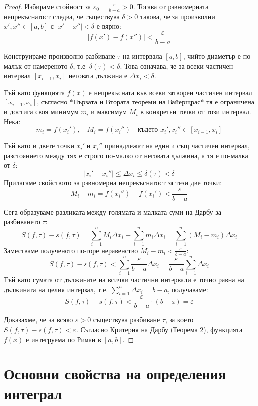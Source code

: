\documentclass{scrartcl}
\begin{document}
\begin{FlushLeft}
\begin{proof}
Избираме стойност за $\varepsilon_0 = \frac{\varepsilon}{b - a} > 0$. Тогава от равномерната непрекъснатост следва, че съществува $\delta > 0$ такова, че за произволни $x', x'' \in [a, b]$ с $|x' - x''| < \delta$ е вярно:
\[ |f(x') - f(x'')| < \frac{\varepsilon}{b - a} \]

Конструираме произволно разбиване $\tau$ на интервала $[a, b]$, чийто диаметър е по-малък от намереното $\delta$, т.е. $\delta(\tau) < \delta$. Това означава, че за всеки частичен интервал $[x_{i-1}, x_i]$ неговата дължина е $\Delta x_i < \delta$.

Тъй като функцията $f(x)$ е непрекъсната във всеки затворен частичен интервал $[x_{i-1}, x_i]$, съгласно *Първата и Втората теореми на Вайерщрас* тя е ограничена и достига своя минимум $m_i$ и максимум $M_i$ в конкретни точки от този интервал. Нека:
\[ m_i = f(x_i'), \quad M_i = f(x_i'') \quad \text{където } x_i', x_i'' \in [x_{i-1}, x_i] \]

Тъй като и двете точки $x_i'$ и $x_i''$ принадлежат на един и същ частичен интервал, разстоянието между тях е строго по-малко от неговата дължина, а тя е по-малка от $\delta$:
\[ |x_i' - x_i''| \le \Delta x_i \le \delta(\tau) < \delta \]
Прилагаме свойството за равномерна непрекъснатост за тези две точки:
\[ M_i - m_i = f(x_i'') - f(x_i') < \frac{\varepsilon}{b - a} \]

Сега образуваме разликата между голямата и малката суми на Дарбу за разбиването $\tau$:
\[ S(f, \tau) - s(f, \tau) = \sum_{i=1}^{n} M_i \Delta x_i - \sum_{i=1}^{n} m_i \Delta x_i = \sum_{i=1}^{n} (M_i - m_i) \Delta x_i \]
Заместваме полученото по-горе неравенство $M_i - m_i < \frac{\varepsilon}{b - a}$:
\[ S(f, \tau) - s(f, \tau) < \sum_{i=1}^{n} \frac{\varepsilon}{b - a} \Delta x_i = \frac{\varepsilon}{b - a} \sum_{i=1}^{n} \Delta x_i \]
Тъй като сумата от дължините на всички частични интервали е точно равна на дължината на целия интервал, т.е. $\sum_{i=1}^{n} \Delta x_i = b - a$, получаваме:
\[ S(f, \tau) - s(f, \tau) < \frac{\varepsilon}{b - a} \cdot (b - a) = \varepsilon \]

Доказахме, че за всяко $\varepsilon > 0$ съществува разбиване $\tau$, за което $S(f, \tau) - s(f, \tau) < \varepsilon$. Съгласно Критерия на Дарбу (Теорема 2), функцията $f(x)$ е интегруема по Риман в $[a, b]$.
\end{proof}

\newpage

\section{Основни свойства на определения интеграл}


\end{FlushLeft}
\end{document}

